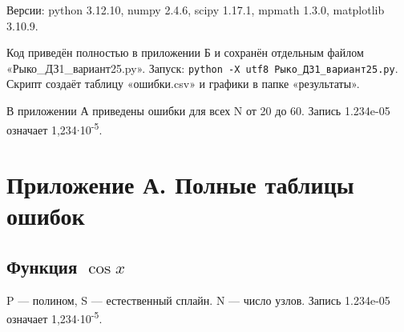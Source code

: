 \documentclass[12pt,a4paper]{article}
\begin{document}
Версии: python 3.12.10, numpy 2.4.6, scipy 1.17.1, mpmath 1.3.0, matplotlib 3.10.9.

Код приведён полностью в приложении Б и сохранён отдельным файлом «Рыко\_ДЗ1\_вариант25.py». Запуск: \texttt{python -X utf8 Рыко\_ДЗ1\_вариант25.py}. Скрипт создаёт таблицу «ошибки.csv» и графики в папке «результаты».

В приложении А приведены ошибки для всех N от 20 до 60. Запись 1.234e-05 означает 1,234\ensuremath{\cdot}10\textsuperscript{-5}.

\clearpage\section*{Приложение А. Полные таблицы ошибок}
\subsection*{Функция $\cos x$}
P — полином, S — естественный сплайн. N — число узлов. Запись 1.234e-05 означает 1,234\ensuremath{\cdot}10\textsuperscript{-5}.
\end{document}
